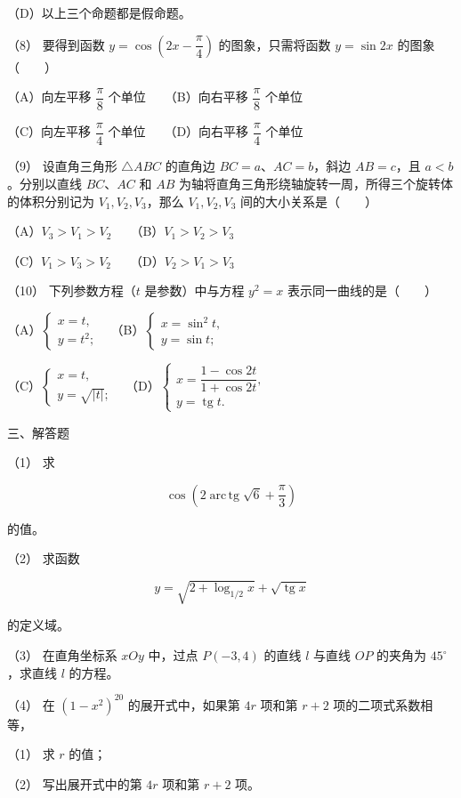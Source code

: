 \begin{question}
（D）以上三个命题都是假命题。

（8） 要得到函数 $y=\cos\left(2x-\dfrac\pi4\right)$ 的图象，只需将函数 $y=\sin 2x$ 的图象\mbox{（　　）}

（A）向左平移 $\dfrac\pi8$ 个单位　　（B）向右平移 $\dfrac\pi8$ 个单位

（C）向左平移 $\dfrac\pi4$ 个单位　　（D）向右平移 $\dfrac\pi4$ 个单位

（9） 设直角三角形 $\triangle ABC$ 的直角边 $BC=a$、$AC=b$，斜边 $AB=c$，且 $a<b$。分别以直线 $BC$、$AC$ 和 $AB$ 为轴将直角三角形绕轴旋转一周，所得三个旋转体的体积分别记为 $V_1,V_2,V_3$，那么 $V_1,V_2,V_3$ 间的大小关系是\mbox{（　　）}

（A）$V_3>V_1>V_2$　　（B）$V_1>V_2>V_3$

（C）$V_1>V_3>V_2$　　（D）$V_2>V_1>V_3$

（10） 下列参数方程（$t$ 是参数）中与方程 $y^2=x$ 表示同一曲线的是\mbox{（　　）}

（A）$\begin{cases}x=t,\\y=t^2;\end{cases}$
　（B）$\begin{cases}x=\sin^2t,\\y=\sin t;\end{cases}$

（C）$\begin{cases}x=t,\\y=\sqrt{|t|};\end{cases}$
　（D）$\begin{cases}x=\dfrac{1-\cos2t}{1+\cos2t},\\y=\operatorname{tg}t.\end{cases}$

\end{question}
\begin{question}

三、解答题

（1） 求

\nopagebreak[4]
\[
\cos\left(2\operatorname{arc\,tg}\sqrt6+\frac\pi3\right)
\]

的值。

（2） 求函数

\nopagebreak[4]
\[
y=\sqrt{2+\log_{1/2}x}+\sqrt{\operatorname{tg}x}
\]

的定义域。

（3） 在直角坐标系 $xOy$ 中，过点 $P(-3,4)$ 的直线 $l$ 与直线 $OP$ 的夹角为 $45^\circ$，求直线 $l$ 的方程。

（4） 在 $(1-x^2)^{20}$ 的展开式中，如果第 $4r$ 项和第 $r+2$ 项的二项式系数相等，

（1） 求 $r$ 的值；

（2） 写出展开式中的第 $4r$ 项和第 $r+2$ 项。

\Needspace{0.4\textheight}
\end{question}
